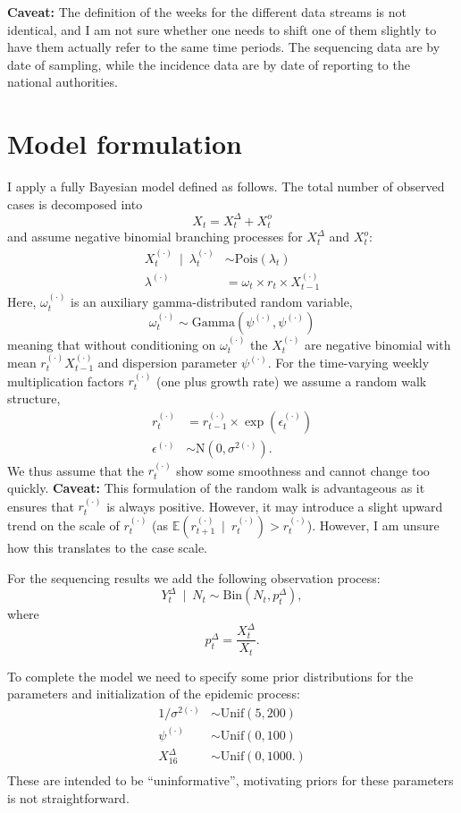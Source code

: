 \documentclass{article}
\begin{document}
\textbf{Caveat:} The definition of the weeks for the different data streams is not identical, and I am not sure whether one needs to shift one of them slightly to have them actually refer to the same time periods. The sequencing data are by date of sampling, while the incidence data are by date of reporting to the national authorities.

\section{Model formulation}

I apply a fully Bayesian model defined as follows. The total number of observed cases is decomposed into
$$
X_t = X^\Delta_t + X^o_t
$$
and assume negative binomial branching processes for $X^\Delta_t$ and $X^o_t$:
\begin{align*}
X^{(\cdot)}_t \ \mid \ \lambda^{(\cdot)}_t & \sim \text{Pois}(\lambda_t)\\
\lambda^{(\cdot)} & = \omega_t \times r_t \times X^{(\cdot)}_{t - 1}
\end{align*}
Here, $\omega^{(\cdot)}_t$ is an auxiliary gamma-distributed random variable,
$$
\omega^{(\cdot)}_t \sim \text{Gamma}(\psi^{(\cdot)}, \psi^{(\cdot)})
$$
meaning that without conditioning on $\omega^{(\cdot)}_t$ the $X^{(\cdot)}_t$ are negative binomial with mean $r^{(\cdot)}_t X^{(\cdot)}_{t - 1}$ and dispersion parameter $\psi^{(\cdot)}$. For the time-varying weekly multiplication factors $r^{(\cdot)}_t$ (one plus growth rate) we assume a random walk structure,
\begin{align*}
r^{(\cdot)}_t & = r^{(\cdot)}_{t - 1} \times \exp(\epsilon^{(\cdot)}_{t})\\
\epsilon^{(\cdot)} & \sim \text{N}(0, \sigma^{2(\cdot)}).
\end{align*}
We thus assume that the $r^{(\cdot)}_t$ show some smoothness and cannot change too quickly. \textbf{Caveat:} This formulation of the random walk is advantageous as it ensures that $r^{(\cdot)}_t$ is always positive. However, it may introduce a slight upward trend on the scale of $r^{(\cdot)}_{t}$ (as $\mathbb{E}(r^{(\cdot)}_{t + 1} \ \mid \ r^{(\cdot)}_{t}) > r^{(\cdot)}_{t}$). However, I am unsure how this translates to the case scale.

For the sequencing results we add the following observation process:
$$
Y^\Delta_t \ \mid \ N_t \sim \text{Bin}(N_t, p^\Delta_t),
$$
where
$$
p^\Delta_t = \frac{X^\Delta_t}{X_t}.
$$

To complete the model we need to specify some prior distributions for the parameters and initialization of the epidemic process:
\begin{align*}
1/\sigma^{2(\cdot)} & \sim \text{Unif}(5, 200)\\
\psi^{(\cdot)} & \sim \text{Unif}(0, 100)\\
X^\Delta_{16} & \sim \text{Unif}(0, 1000.)\\
\end{align*}
These are intended to be ``uninformative'', motivating priors for these parameters is not straightforward.
\end{document}
